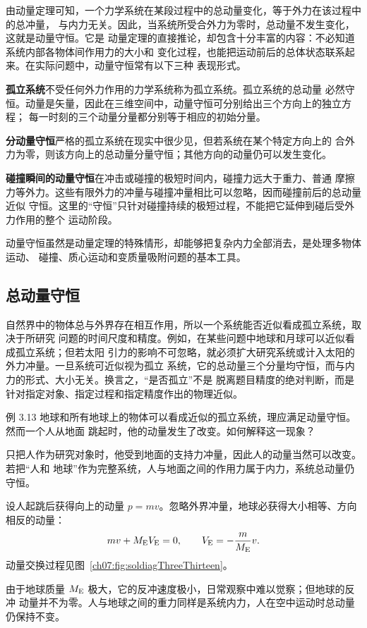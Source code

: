 由动量定理可知，一个力学系统在某段过程中的总动量变化，等于外力在该过程中的总冲量，
与内力无关。因此，当系统所受合外力为零时，总动量不发生变化，这就是动量守恒。它是
动量定理的直接推论，却包含十分丰富的内容：不必知道系统内部各物体间作用力的大小和
变化过程，也能把运动前后的总体状态联系起来。在实际问题中，动量守恒常有以下三种
表现形式。

\textbf{孤立系统}\quad 不受任何外力作用的力学系统称为孤立系统。孤立系统的总动量
必然守恒。动量是矢量，因此在三维空间中，动量守恒可分别给出三个方向上的独立方程；
每一时刻的三个动量分量都分别等于相应的初始分量。

\textbf{分动量守恒}\quad 严格的孤立系统在现实中很少见，但若系统在某个特定方向上的
合外力为零，则该方向上的总动量分量守恒；其他方向的动量仍可以发生变化。

\textbf{碰撞瞬间的动量守恒}\quad 在冲击或碰撞的极短时间内，碰撞力远大于重力、普通
摩擦力等外力。这些有限外力的冲量与碰撞冲量相比可以忽略，因而碰撞前后的总动量近似
守恒。这里的“守恒”只针对碰撞持续的极短过程，不能把它延伸到碰后受外力作用的整个
运动阶段。

动量守恒虽然是动量定理的特殊情形，却能够把复杂内力全部消去，是处理多物体运动、
碰撞、质心运动和变质量吸附问题的基本工具。

\subsection{总动量守恒}

自然界中的物体总与外界存在相互作用，所以一个系统能否近似看成孤立系统，取决于所研究
问题的时间尺度和精度。例如，在某些问题中地球和月球可以近似看成孤立系统；但若太阳
引力的影响不可忽略，就必须扩大研究系统或计入太阳的外力冲量。一旦系统可近似视为孤立
系统，它的总动量三个分量均守恒，而与内力的形式、大小无关。换言之，“是否孤立”不是
脱离题目精度的绝对判断，而是针对指定对象、指定过程和指定精度作出的物理近似。



\begin{origexamplebox}{例 3.13}
地球和所有地球上的物体可以看成近似的孤立系统，理应满足动量守恒。然而一个人从地面
跳起时，他的动量发生了改变。如何解释这一现象？
\end{origexamplebox}

\begin{xesolution}
只把人作为研究对象时，他受到地面的支持力冲量，因此人的动量当然可以改变。若把“人和
地球”作为完整系统，人与地面之间的作用力属于内力，系统总动量仍守恒。

设人起跳后获得向上的动量 $p=mv$。忽略外界冲量，地球必获得大小相等、方向相反的动量：
\[
 mv+M_{\rm E}V_{\rm E}=0,
 \qquad
 V_{\rm E}=-\frac{m}{M_{\rm E}}v.
\]
动量交换过程见图~\ref{ch07:fig:soldiagThreeThirteen}。

\soldiagThreeThirteen
由于地球质量 $M_{\rm E}$ 极大，它的反冲速度极小，日常观察中难以觉察；但地球的反冲
动量并不为零。人与地球之间的重力同样是系统内力，人在空中运动时总动量仍保持不变。
\end{xesolution}

